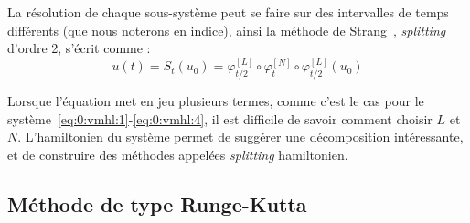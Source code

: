 La résolution de chaque sous-système peut se faire sur des intervalles de temps différents (que nous noterons en indice), ainsi la méthode de Strang~\cite{Strang:1968}, \emph{splitting} d'ordre 2, s'écrit comme :
$$
  u(t) = S_{t}(u_0) = \varphi^{[L]}_{t/2}\circ\varphi^{[N]}_{t}\circ\varphi^{[L]}_{t/2}(u_0)
$$

Lorsque l'équation met en jeu plusieurs termes, comme c'est le cas pour le système~\eqref{eq:0:vmhl:1}-\eqref{eq:0:vmhl:4}, il est difficile de savoir comment choisir $L$ et $N$. L'hamiltonien du système permet de suggérer une décomposition intéressante, et de construire des méthodes appelées \emph{splitting} hamiltonien. 


\subsection{Méthode de type Runge-Kutta}

